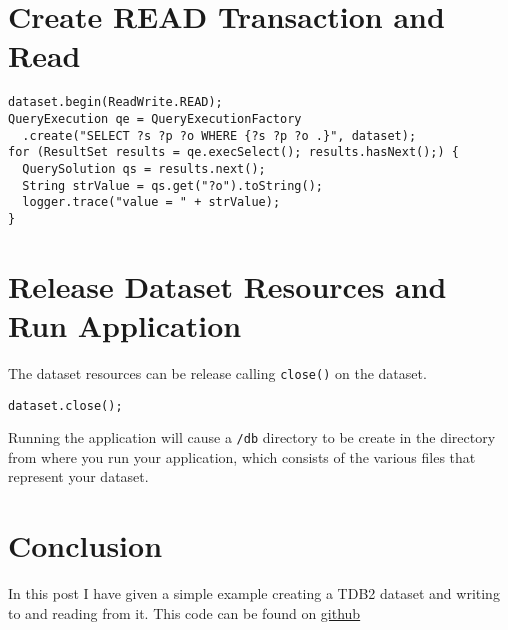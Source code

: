 \documentclass{amsart}
\begin{document}
  \section{Create READ Transaction and Read}
  \begin{small}
  \begin{verbatim}
dataset.begin(ReadWrite.READ);
QueryExecution qe = QueryExecutionFactory
  .create("SELECT ?s ?p ?o WHERE {?s ?p ?o .}", dataset);
for (ResultSet results = qe.execSelect(); results.hasNext();) {
  QuerySolution qs = results.next();
  String strValue = qs.get("?o").toString();
  logger.trace("value = " + strValue);
}   
  \end{verbatim} 
  \end{small}
  
  \section{Release Dataset Resources and Run Application}
  The dataset resources can be release calling \texttt{close()} on the dataset.  
  \begin{small}
   \begin{verbatim}
dataset.close();
   \end{verbatim}
  \end{small}
  
  Running the application will cause a \texttt{/db} directory to be create in the directory from where you run your application, which consists of the various files that represent your dataset. 
  
  \section{Conclusion}
  In this post I have given a simple example creating a TDB2 dataset and writing to and reading from it. This code can be found on \href{}{github}
  

  

  
  
  
  
 
\end{document}
